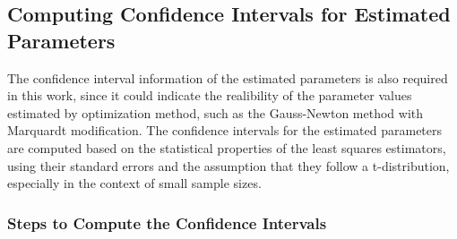 \documentclass[12pt]{article} %
\begin{document}
\subsection{Computing Confidence Intervals for Estimated Parameters}

The confidence interval information of the estimated parameters is also required in this work, since it could indicate the realibility of the parameter values estimated by optimization method, such as the Gauss-Newton method with Marquardt modification. The confidence intervals for the estimated parameters are computed based on the statistical properties of the least squares estimators, using their standard errors and the assumption that they follow a t-distribution, especially in the context of small sample sizes.

\subsubsection{Steps to Compute the Confidence Intervals}
\end{document}
